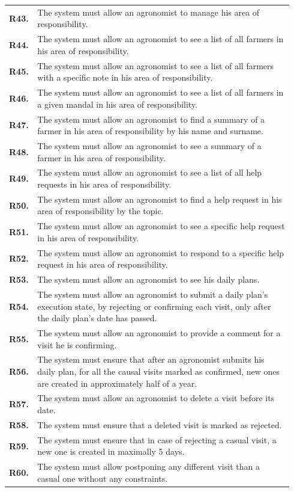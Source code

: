 \begin{longtable}{@{}p{0.06\linewidth} p{0.88\linewidth}}
		\textbf{R43.} & The system must allow an agronomist to manage his area of responsibility.\\
		\textbf{R44.} & The system must allow an agronomist to see a list of all farmers in his area of responsibility.\\
		\textbf{R45.} & The system must allow an agronomist to see a list of all farmers with a specific note in his area of responsibility.\\
		\textbf{R46.} & The system must allow an agronomist to see a list of all farmers in a given mandal in his area of responsibility.\\
		\textbf{R47.} & The system must allow an agronomist to find a summary of a farmer in his area of responsibility by his name and surname.\\
		\textbf{R48.} & The system must allow an agronomist to see a summary of a farmer in his area of responsibility.\\
		\textbf{R49.} & The system must allow an agronomist to see a list of all help requests in his area of responsibility.\\
		\textbf{R50.} & The system must allow an agronomist to find a help request in his area of responsibility by the topic.\\
		\textbf{R51.} & The system must allow an agronomist to see a specific help request in his area of responsibility.\\
		\textbf{R52.} & The system must allow an agronomist to respond to a specific help request in his area of responsibility.\\
		\textbf{R53.} & The system must allow an agronomist to see his daily plans.\\
		\textbf{R54.} & The system must allow an agronomist to submit a daily plan's execution state, by rejecting or confirming each visit, only after the daily plan's date has passed.\\
		\textbf{R55.} & The system must allow an agronomist to provide a comment for a visit he is confirming.\\
		\textbf{R56.} & The system must ensure that after an agronomist submits his daily plan, for all the causal visits marked as confirmed, new ones are created in approximately half of a year.\\
		\textbf{R57.} & The system must allow an agronomist to delete a visit before its date.\\
		\textbf{R58.} & The system must ensure that a deleted visit is marked as rejected.\\
		\textbf{R59.} & The system must ensure that in case of rejecting a casual visit, a new one is created in maximally 5 days.\\
		\textbf{R60.} & The system must allow postponing any different visit than a casual one without any constraints.\\
		

\end{longtable}
